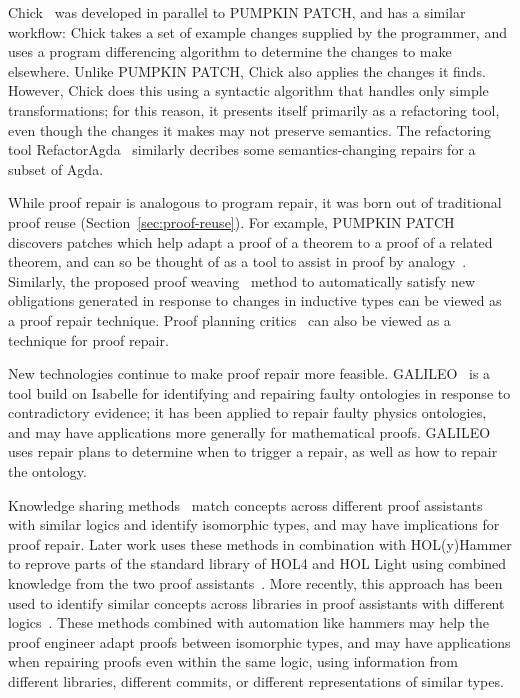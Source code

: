 Chick~\citep{robert2018} was developed in parallel to \textsc{PUMPKIN PATCH}, and has a similar workflow:
Chick takes a set of example changes supplied by the programmer,
and uses a program differencing algorithm to determine the changes to make elsewhere.
Unlike \textsc{PUMPKIN PATCH}, Chick also applies the changes it finds.
However, Chick does this using a syntactic algorithm that handles only simple transformations;
for this reason, it presents itself primarily as a refactoring tool, even though the changes it makes may
not preserve semantics. The refactoring tool RefactorAgda~\citep{wibergh2019} similarly decribes some semantics-changing
repairs for a subset of Agda.

While proof repair is analogous to program repair, it was born out of traditional proof reuse (Section~\ref{sec:proof-reuse}).
For example, \textsc{PUMPKIN PATCH} discovers patches which help adapt a proof of a theorem to a proof of a related theorem,
and can so be thought of as a tool to assist in proof by analogy~\citep{curien1995}.
Similarly, the proposed proof weaving~\citep{Mulhern06proofweaving} method to automatically satisfy new obligations 
generated in response to changes in inductive types can be viewed as a proof repair technique.
Proof planning critics~\citep{ireland1996} can also be viewed as a technique for proof repair.

New technologies continue to make proof repair more feasible.
GALILEO~\citep{chan2011galileo} is a tool build on Isabelle for identifying and repairing faulty ontologies in response to contradictory
evidence; it has been applied to repair faulty physics ontologies, and may have applications more generally for mathematical proofs.
GALILEO uses repair plans to determine when to trigger a repair, as well as how to repair the ontology.

Knowledge sharing methods~\citep{gauthier2014} match concepts across
different proof assistants with similar logics and identify isomorphic types,
and may have implications for proof repair.
Later work uses these methods in combination with HOL(y)Hammer to
reprove parts of the standard library of HOL4 and HOL Light using combined knowledge 
from the two proof assistants~\citep{Gauthier2015}. 
More recently, this approach has been used to identify similar concepts
across libraries in proof assistants with different logics~\citep{gauthier2017}.
These methods combined with automation like hammers may help the proof engineer 
adapt proofs between isomorphic types, and may have applications
when repairing proofs even within the same logic, using information from different 
libraries, different commits, or different representations of similar types.

